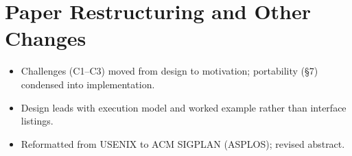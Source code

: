 \documentclass[10pt]{article}
\begin{document}
\section{Paper Restructuring and Other Changes}

\begin{itemize}[nosep, leftmargin=1.5em]
  \item Challenges (C1--C3) moved from design to motivation; portability (\S7) condensed into implementation.
  \item Design leads with execution model and worked example rather than interface listings.
  \item Reformatted from USENIX to ACM SIGPLAN (ASPLOS); revised abstract.
\end{itemize}
\end{document}
